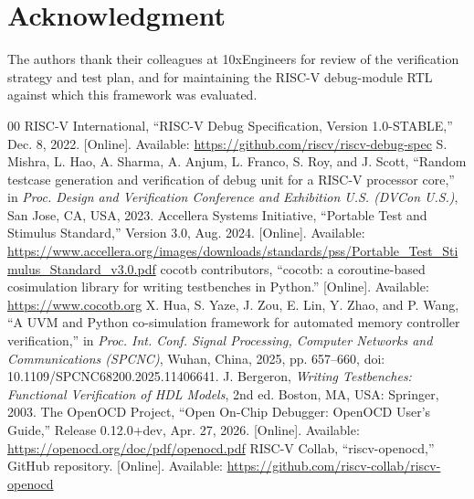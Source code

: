 \documentclass[conference]{IEEEtran}
\begin{document}
\section*{Acknowledgment}
The authors thank their colleagues at 10xEngineers for review of the verification strategy and test plan, and for maintaining the RISC-V debug-module RTL against which this framework was evaluated.

\begin{thebibliography}{00}
 RISC-V International, ``RISC-V Debug Specification, Version 1.0-STABLE,'' Dec. 8, 2022. [Online]. Available: \url{https://github.com/riscv/riscv-debug-spec}
 S. Mishra, L. Hao, A. Sharma, A. Anjum, L. Franco, S. Roy, and J. Scott, ``Random testcase generation and verification of debug unit for a RISC-V processor core,'' in \textit{Proc. Design and Verification Conference and Exhibition U.S. (DVCon U.S.)}, San Jose, CA, USA, 2023.
 Accellera Systems Initiative, ``Portable Test and Stimulus Standard,'' Version 3.0, Aug. 2024. [Online]. Available: \url{https://www.accellera.org/images/downloads/standards/pss/Portable_Test_Stimulus_Standard_v3.0.pdf}
 cocotb contributors, ``cocotb: a coroutine-based cosimulation library for writing testbenches in Python.'' [Online]. Available: \url{https://www.cocotb.org}
 X. Hua, S. Yaze, J. Zou, E. Lin, Y. Zhao, and P. Wang, ``A UVM and Python co-simulation framework for automated memory controller verification,'' in \textit{Proc. Int. Conf. Signal Processing, Computer Networks and Communications (SPCNC)}, Wuhan, China, 2025, pp. 657--660, doi: 10.1109/SPCNC68200.2025.11406641.
 J. Bergeron, \textit{Writing Testbenches: Functional Verification of HDL Models}, 2nd ed. Boston, MA, USA: Springer, 2003.
 The OpenOCD Project, ``Open On-Chip Debugger: OpenOCD User's Guide,'' Release 0.12.0+dev, Apr. 27, 2026. [Online]. Available: \url{https://openocd.org/doc/pdf/openocd.pdf}
 RISC-V Collab, ``riscv-openocd,'' GitHub repository. [Online]. Available: \url{https://github.com/riscv-collab/riscv-openocd}
\end{thebibliography}
\end{document}
